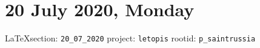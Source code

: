  
 
\section{20 July 2020, Monday}
  
\vspace{0.5cm}
{\small\LaTeX section: \verb|20_07_2020| project: \verb|letopis| rootid: \verb|p_saintrussia|}
\vspace{0.5cm}
 
